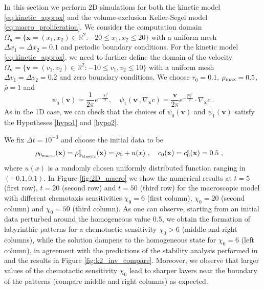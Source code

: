 \documentclass{article}
\begin{document}
{In this section we perform 2D simulations for both  {{the kinetic model \eqref{eq:kinetic_approx}}} and  {{the volume-exclusion Keller-Segel model \eqref{eq:macro_proliferation}}}. 
We consider the computation domain $\Omega_\mathbf{x} = \{\mathbf{x} = (x_1,x_2)\in\mathbb{R}^2: -20\le x_1, x_2 \le 20\}$ with a uniform mesh $\Delta x_1 = \Delta x_2 = 0.1$ and periodic boundary conditions.  
For the kinetic model \eqref{eq:kinetic_approx}, we need to further define the domain of the velocity $\Omega_\mathbf{v} = \{\mathbf{v} = (v_1,v_2)\in\mathbb{R}^2: -10\le v_1, v_2 \le 10\}$ with a uniform mesh $\Delta v_1 = \Delta v_2 = 0.2$ and zero boundary conditions. 
We choose $r_0=0.1$, $\rho_{\rm max} = 0.5$, $\bar{\rho} = 1$ and 
\begin{equation*}
    \psi_0(\mathbf{v}) = \frac{1}{2\pi} e^{-\frac{|\mathbf{v}|^2}{2}}, \quad \psi_1(\mathbf{v}\ , \nabla_\mathbf{x} c) = \frac{\mathbf{v}}{2\pi} e^{-\frac{|\mathbf{v}|^2}{2}}\cdot \nabla_\mathbf{x} c\ .
\end{equation*}
As in the 1D case, we can check that the choices of $\psi_0(\mathbf{v})$ and $\psi_1(\mathbf{v})$ satisfy the Hypotheses \ref{hypo1} and \ref{hypo2}.


We fix $\Delta t = 10^{-3}$ and choose the initial data to be
\begin{align*}
	&\rho_{0_\textnormal{macro}}(\mathbf{x}) =  \rho_{0_\textnormal{kinetic}}^\varepsilon(\mathbf{x}) =  \rho_0 + u(x)\ , \quad c_0(\mathbf{x}) = c_0^\varepsilon(\mathbf{x}) = 0.5\ , %
\end{align*}
where $u(x)$ is a randomly chosen uniformly distributed function ranging in $(-0.1, 0.1)$. 
In Figure \ref{fig:2D_macro} we show the numerical results at $t=5$ (first row), $t=20$ (second row) and $t=50$ (third row) for the macroscopic model with different chemotaxis sensitivities $\chi_0=6$ (first column), $\chi_0=20$ (second column) and $\chi_0=50$ (third column). As one can observe, starting from an initial data perturbed around the homogeneous value $0.5$, we obtain the formation of labyrinthic patterns for a chemotactic sensitivity $\chi_0>6$ (middle and right columns), while the solution dampens to the homogeneous state for $\chi_0=6$ (left column), in agreement with the predictions of the stability analysis performed in \cite{almeida2020treatment} and the results in Figure \ref{fig:k2_inv_compare}. Moreover, we observe that larger values of the chemotactic sensitivity $\chi_0$ {lead} to sharper layers near the boundary of the patterns (compare middle and right columns) as expected. 

}
\end{document}
